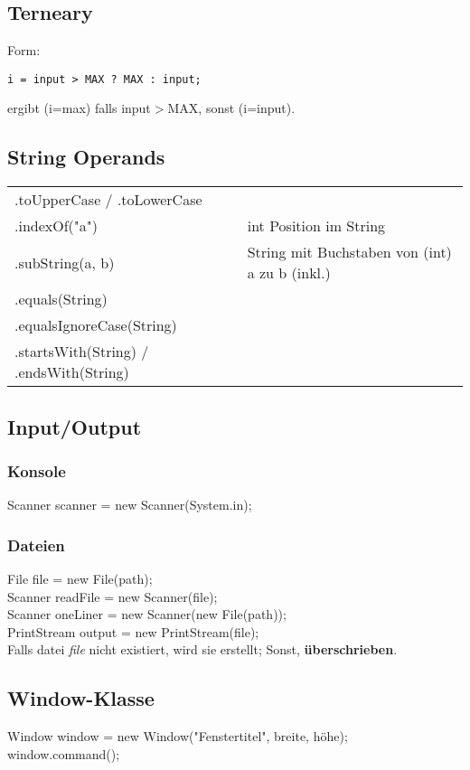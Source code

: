 \documentclass[12pt,a4paper]{article}
\begin{document}
\subsection{Terneary}
Form:\\
\begin{verbatim}
i = input > MAX ? MAX : input;
\end{verbatim}
ergibt (i=max) falls input$>$MAX, sonst (i=input).
\subsection{String Operands}
\begin{tabularx}{\linewidth}{l X}
.toUpperCase / .toLowerCase\\
.indexOf("a") & int Position im String\\
.subString(a, b) & String mit Buchstaben von (int) a zu b (inkl.)\\
.equals(String)\\
.equalsIgnoreCase(String)\\
.startsWith(String) / .endsWith(String)
\end{tabularx}
\subsection{Input/Output}
\subsubsection{Konsole}
Scanner scanner = new Scanner(System.in);
\subsubsection{Dateien}
File file = new File(path);\\
Scanner readFile = new Scanner(file);\\
Scanner oneLiner = new Scanner(new File(path));\\
PrintStream output = new PrintStream(file);\\
\hspace*{1cm} Falls datei \textit{file} nicht existiert, wird sie erstellt; Sonst, \textbf{überschrieben}.
\newpage
\subsection{Window-Klasse}
Window window = new Window("Fenstertitel", breite, höhe);\\
window.command();\\\\
\end{document}
